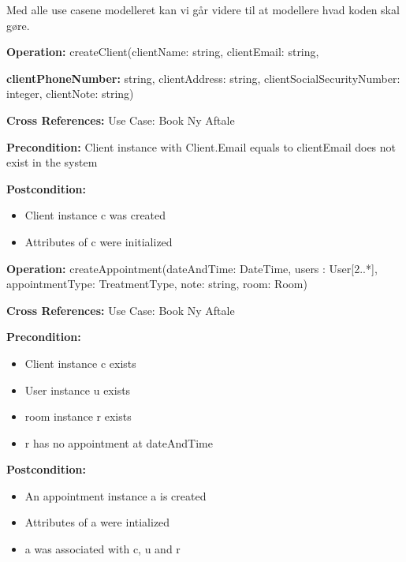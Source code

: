 %
%
%
 
Med alle use casene modelleret kan vi går videre til at modellere hvad koden skal gøre.  
 
\noindent

\textbf{Operation:} createClient(clientName: string, clientEmail: string, 

\textbf{clientPhoneNumber:} string, clientAddress: string, clientSocialSecurityNumber: integer, clientNote: string) 

\textbf{Cross References:} Use Case: Book Ny Aftale 

\textbf{Precondition:} Client instance with Client.Email equals to clientEmail does not exist in the system 

\textbf{Postcondition:}  
		\begin{itemize}
			\item Client instance c was created 
			\item Attributes of c were initialized
		\end{itemize}
  
\textbf{Operation:} createAppointment(dateAndTime: DateTime, users : User[2..*], appointmentType: TreatmentType, note: string, room: Room) 

\textbf{Cross References:} Use Case: Book Ny Aftale 

\textbf{Precondition: }
		\begin{itemize}
			\item Client instance c exists 
			\item User instance u exists 
			\item room instance r exists 
			\item r has no appointment at dateAndTime
		\end{itemize}
		
\textbf{Postcondition:}  
        \begin{itemize}
            \item An appointment instance a is created
            \item Attributes of a were intialized
            \item a was associated with c, u and r
        \end{itemize}